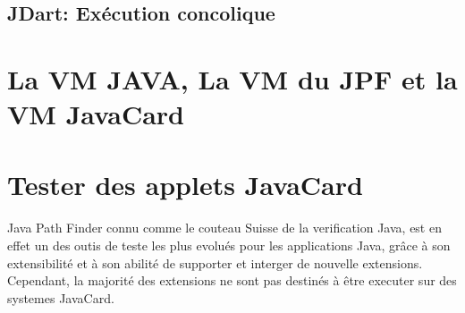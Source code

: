     \subsection{JDart: Exécution concolique}
	
    
      
  \section{La VM JAVA, La VM du JPF et la VM JavaCard}
  \section{Tester des applets JavaCard}
  \paragraph{}
    Java Path Finder connu comme le couteau Suisse de la verification Java,
    est en effet un des outis de teste les plus evolués pour les applications Java,
    grâce à son extensibilité et à son abilité de supporter et interger de nouvelle extensions.
    Cependant, la majorité des extensions ne sont pas destinés à être executer sur des systemes JavaCard.